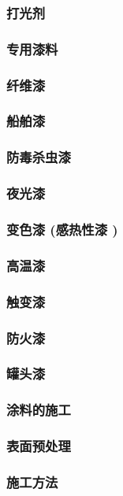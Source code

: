 \documentclass[UTF8]{../../ApplicationUniverse}
\begin{document}
    \subsubsection{打光剂}
\subsubsection{专用漆料}
    \subsubsection{纤维漆}
    \subsubsection{船舶漆}
    \subsubsection{防毒杀虫漆}
    \subsubsection{夜光漆}
    \subsubsection{变色漆 (感热性漆 )}
    \subsubsection{高温漆}
    \subsubsection{触变漆}
    \subsubsection{防火漆}
    \subsubsection{罐头漆}
\subsubsection{涂料的施工}
    \subsubsection{表面预处理}
    \subsubsection{施工方法}
\end{document}
